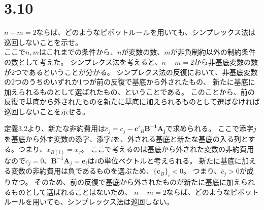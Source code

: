 \documentclass{jsarticle}
\begin{document}
\section*{3.10}
$n-m=2$ならば、どのようなピボットルールを用いても、シンプレックス法は巡回しないことを示せ。
 \\

ここで$n,m$はこれまでの条件から、$n$が変数の数、$m$が非負制約以外の制約条件の数として考えた。
シンプレクス法を考えると、$n-m=2$から非基底変数の数が2つであるということが分かる。
シンプレクス法の反復において、非基底変数の2つのうちのいずれか1つが前の反復で基底から外されたもの、
新たに基底に加えられるものとして選ばれたもの、ということである。
このことから、前の反復で基底から外されたものを新たに基底に加えられるものとして選ばなければ巡回しないことを示せる。

定義3.2より、新たな非約費用は$\bar{c}_j=c_j-\bm{c}'_B\bm{B^{-1}\bm{A}_j}$で求められる。
ここで添字$j$を基底から外す変数の添字、添字$i$を、外される基底と新たな基底の入る列とする。つまり、$x_{B(i)}=x_j$。
ここで考えるのは基底から外された変数の非約費用なので$c_j=0$、$\bm{B}^{-1}\bm{A}_j=\bm{e}_i$は$i$の単位ベクトルと考えられる。
新たに基底に加える変数の非約費用は負であるものを選ぶため、$\{\bm{c}_B\}_i<0$。
つまり、$\bar{c}_j>0$が成り立つ。
そのため、前の反復で基底から外されたものが新たに基底に加えられるものとして選ばれることはないため、
$n-m=2$ならば、どのようなピボットルールを用いても、シンプレックス法は巡回しない。
\end{document}

